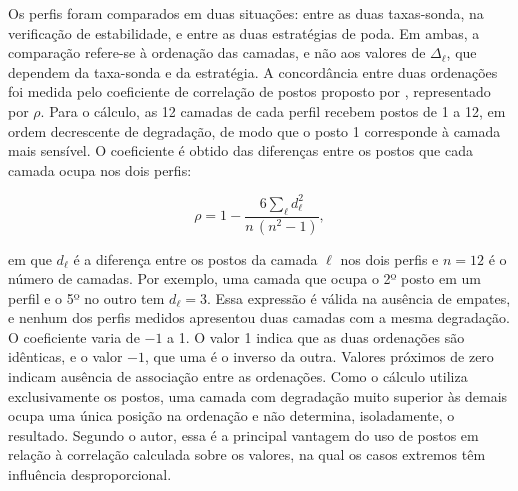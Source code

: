 Os perfis foram comparados em duas situações: entre as duas taxas-sonda, na verificação de
estabilidade, e entre as duas estratégias de poda. Em ambas, a comparação refere-se à
ordenação das camadas, e não aos valores de $\Delta_{\ell}$, que dependem da taxa-sonda e da
estratégia. A concordância entre duas ordenações foi medida pelo coeficiente de correlação de
postos proposto por , representado por $\rho$. Para o cálculo, as 12
camadas de cada perfil recebem postos de 1 a 12, em ordem decrescente de degradação, de modo
que o posto 1 corresponde à camada mais sensível. O coeficiente é obtido das diferenças entre
os postos que cada camada ocupa nos dois perfis:

\begin{equation}\label{eq:spearman}
\rho = 1 - \frac{6 \sum_{\ell} d_{\ell}^{2}}{n\,(n^{2}-1)},
\end{equation}

\noindent em que $d_{\ell}$ é a diferença entre os postos da camada $\ell$ nos dois perfis e
$n = 12$ é o número de camadas. Por exemplo, uma camada que ocupa o 2º posto em um perfil e o
5º no outro tem $d_{\ell} = 3$. Essa expressão é válida na ausência de empates, e nenhum dos
perfis medidos apresentou duas camadas com a mesma degradação. O coeficiente varia de $-1$ a
1. O valor 1 indica que as duas ordenações são idênticas, e o valor $-1$, que uma é o inverso
da outra. Valores próximos de zero indicam ausência de associação entre as ordenações. Como o
cálculo utiliza exclusivamente os postos, uma camada com degradação muito superior às demais
ocupa uma única posição na ordenação e não determina, isoladamente, o resultado. Segundo o
autor, essa é a principal vantagem do uso de postos em relação à correlação calculada sobre
os valores, na qual os casos extremos têm influência desproporcional.

